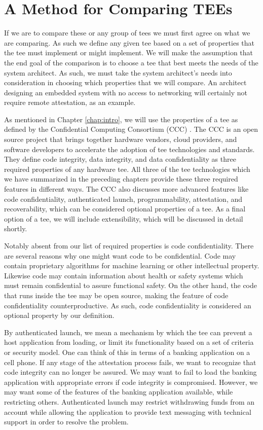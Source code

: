 \section{A Method for Comparing TEEs}
If we are to compare these or any group of \glspl{tee} we must first agree on what we are comparing. As such we define any given \gls{tee} based on a set of properties that the \gls{tee} must implement or might implement. We will make the assumption that the end goal of the comparison is to choose a \gls{tee} that best meets the needs of the system architect. As such, we must take the system architect's needs into consideration in choosing which properties that we will compare. An architect designing an embedded system with no access to networking will certainly not require remote \gls{attestation}, as an example. 

As mentioned in Chapter \ref{chap:intro}, we will use the properties of a \gls{tee} as defined by the Confidential Computing Consortium (CCC) \cite{cccTAC}. The CCC is an open source project that brings together hardware vendors, cloud providers, and software developers to accelerate the adoption of \gls{tee} technologies and standards. They define code integrity, data integrity, and data confidentiality as three required properties of any hardware \gls{tee}. All three of the \gls{tee} technologies which we have summarized in the preceding chapters provide these three required features in different ways. The CCC also discusses more advanced features like code confidentiality, authenticated launch, programmability, \gls{attestation}, and recoverability, which can be considered optional properties of a \gls{tee}. As a final option of a \gls{tee}, we will include extensibility, which will be discussed in detail shortly.

Notably absent from our list of required properties is code confidentiality. There are several reasons why one might want code to be confidential. Code may contain proprietary algorithms for machine learning or other intellectual property. Likewise code may contain information about health or safety systems which must remain confidential to assure functional safety. On the other hand, the code that runs inside the \gls{tee} may be open source, making the feature of code confidentiality counterproductive. As such, code confidentiality is considered an optional property by our definition.

By authenticated launch, we mean a mechanism by which the \gls{tee} can prevent a host application from loading, or limit its functionality based on a set of criteria or security model. One can think of this in terms of a banking application on a cell phone. If any stage of the \gls{attestation} process fails, we want to recognize that code integrity can no longer be assured. We may want to fail to load the banking application with appropriate errors if code integrity is compromised. However, we may want some of the features of the banking application available, while restricting others. Authenticated launch may restrict withdrawing funds from an account while allowing the application to provide text messaging with technical support in order to resolve the problem.

